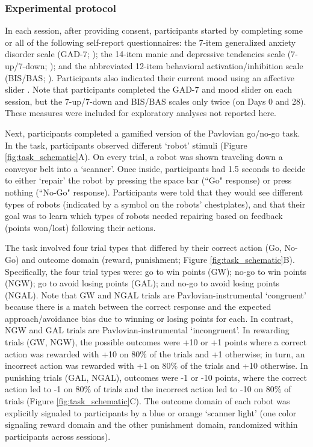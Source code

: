 \documentclass[a4paper,12pt]{article}
\begin{document}
\begin{refsection}[main]
\subsubsection*{Experimental protocol}

In each session, after providing consent, participants started by completing some or all of the following self-report questionnaires: the 7-item generalized anxiety disorder scale (GAD-7; \cite{spitzer2006brief}); the 14-item manic and depressive tendencies scale (7-up/7-down; \cite{youngstrom20137}); and the abbreviated 12-item behavioral activation/inhibition scale (BIS/BAS; \cite{pagliaccio2016revising}). Participants also indicated their current mood using an affective slider \cite{betella2016affective}. Note that participants completed the GAD-7 and mood slider on each session, but the 7-up/7-down and BIS/BAS scales only twice (on Days 0 and 28). These measures were included for exploratory analyses not reported here. 

Next, participants completed a gamified version of the Pavlovian go/no-go task. In the task, participants observed different `robot' stimuli (Figure \ref{fig:task_schematic}A). On every trial, a robot was shown traveling down a conveyor belt into a `scanner'. Once inside, participants had 1.5 seconds to decide to either `repair' the robot by pressing the space bar (``Go" response) or press nothing (``No-Go" response). Participants were told that they would see different types of robots (indicated by a symbol on the robots' chestplates), and that their goal was to learn which types of robots needed repairing based on feedback (points won/lost) following their actions.

The task involved four trial types that differed by their correct action (Go, No-Go) and outcome domain (reward, punishment; Figure \ref{fig:task_schematic}B). Specifically, the four trial types were: go to win points (GW); no-go to win points (NGW); go to avoid losing points (GAL); and no-go to avoid losing points (NGAL). Note that GW and NGAL trials are Pavlovian-instrumental `congruent' because there is a match between the correct response and the expected approach/avoidance bias due to winning or losing points for each. In contrast, NGW and GAL trials are Pavlovian-instrumental `incongruent'. In rewarding trials (GW, NGW), the possible outcomes were +10 or +1 points where a correct action was rewarded with +10 on $80\%$ of the trials and +1 otherwise; in turn, an incorrect action was rewarded with +1 on $80\%$ of the trials and +10 otherwise. In punishing trials (GAL, NGAL), outcomes were -1 or -10 points, where the correct action led to -1 on $80\%$ of trials and the incorrect action led to -10 on $80\%$ of trials (Figure \ref{fig:task_schematic}C). The outcome domain of each robot was explicitly signaled to participants by a blue or orange `scanner light' (one color signaling reward domain and the other punishment domain, randomized within participants across sessions). 


\end{refsection}
\end{document}

